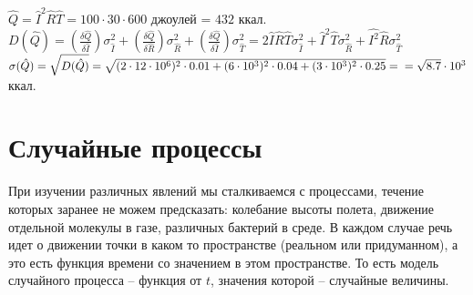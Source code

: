 \documentclass[russian, 12pt, fleqn]{article}
\begin{document}
$\hat{Q} = \hat{I}^2 \hat{R} \hat{T} = 100\cdot30\cdot600$ джоулей = $432$ ккал.\\
$D(\hat{Q}) = (\frac{\delta \hat{Q}}{\delta \hat{I}}) \sigma^2_{\hat{I}} + (\frac{\delta \hat{Q}}{\delta \hat{R}}) \sigma^2_{\hat{R}} + (\frac{\delta \hat{Q}}{\delta \hat{I}}) \sigma^2_{\hat{T}} = 2\hat{I}\hat{R}\hat{T} \sigma_{\hat{I}}^2 + \hat{I}^2\hat{T} \sigma_{\hat{R}}^2  + \hat{I^2}\hat{R}\sigma_{\hat{T}}^2$\\
$\sigma(\hat{Q}) = \sqrt{D(\hat{Q})} = \sqrt{(2\cdot12\cdot 10^6)^2\cdot 0.01 + (6\cdot 10^3)^2 \cdot 0.04 + (3 \cdot 10^3)^2 \cdot 0.25} = \\ = \sqrt{8.7} \cdot 10^3$ ккал.
\section{Случайные процессы}
\noindent
При изучении различных явлений мы сталкиваемся с процессами, течение которых заранее не можем предсказать: колебание высоты полета, движение отдельной молекулы в газе, различных бактерий в %
среде. В каждом случае речь идет о движении точки в каком то пространстве (реальном или придуманном), а это есть функция времени со значением в этом пространстве.
То есть модель случайного процесса -- функция от $t$, значения которой -- случайные величины.\\
\end{document}
